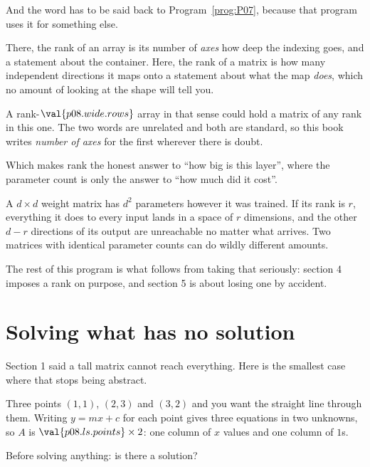 
\begin{fr}
\begin{note}
And the word has to be said back to Program~\ref{prog:P07}, because that
program uses it for something else.

There, the rank of an array is its number of \emph{axes} \dash{} how deep the
indexing goes, and a statement about the container. Here, the rank of a matrix
is how many independent directions it maps onto \dash{} a statement about what
the map \emph{does}, which no amount of looking at the shape will tell you.

A rank-$\val{p08.wide.rows}$ array in that sense could hold a matrix of any
rank in this one. The two words are unrelated and both are standard, so this
book writes \emph{number of axes} for the first wherever there is doubt.
\end{note}
\end{fr}

\begin{fr}
\begin{aibox}
Which makes rank the honest answer to \enquote{how big is this layer}, where
the parameter count is only the answer to \enquote{how much did it cost}.

A $d \times d$ weight matrix has $d^{2}$ parameters however it was trained. If
its rank is $r$, everything it does to every input lands in a space of $r$
dimensions, and the other $d - r$ directions of its output are unreachable no
matter what arrives. Two matrices with identical parameter counts can do
wildly different amounts.

The rest of this program is what follows from taking that seriously: section 4
imposes a rank on purpose, and section 5 is about losing one by accident.
\end{aibox}
\end{fr}

\section{Solving what has no solution}
\label{sec:P08-least-squares}

\begin{fr}
Section 1 said a tall matrix cannot reach everything. Here is the smallest case
where that stops being abstract.

Three points \dash{} $(1, 1)$, $(2, 3)$ and $(3, 2)$ \dash{} and you want the
straight line through them. Writing $y = mx + c$ for each point gives three
equations in two unknowns, so $A$ is
$\val{p08.ls.points} \times 2$: one column of $x$ values and one column of
$1$s.

Before solving anything: is there a solution?
\dotline
\nextframe
\end{fr}


